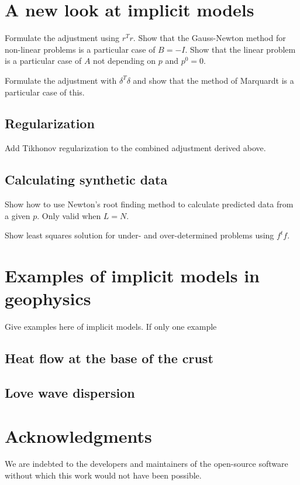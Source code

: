\documentclass[onecolumn]{article}
\begin{document}
\section{A new look at implicit models}

Formulate the adjustment using $r^Tr$.
Show that the Gauss-Newton method
for non-linear problems
is a particular case of $B = -I$.
Show that the linear problem
is a particular case of $A$ not depending on $p$
and $p^0 = 0$.

Formulate the adjustment with $\delta^T\delta$
and show that the method of Marquardt
is a particular case of this.



\subsection{Regularization}

Add Tikhonov regularization to the combined adjustment derived above.



\subsection{Calculating synthetic data}

Show how to use Newton's root finding method to calculate predicted data from a
given $p$. Only valid when $L = N$.

Show least squares solution for under- and over-determined problems using
$f^tf$.




\section{Examples of implicit models in geophysics}

Give examples here of implicit models.
If only one example


\subsection{Heat flow  at the base of the crust}

\subsection{Love wave dispersion}


\section{Acknowledgments}

We are indebted to the developers and maintainers of the open-source
software without which this work would not have been possible.




\end{document}
